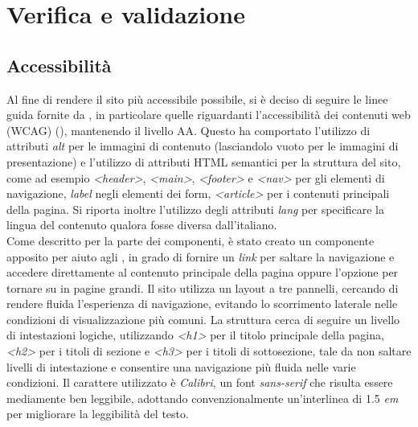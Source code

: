 \chapter{Verifica e validazione}\label{cap:verifica-validazione}


\section{Accessibilità}\label{sec:verifica-validazione-accessibilita}

Al fine di rendere il sito più accessibile possibile, si è deciso di seguire le linee guida fornite da , in particolare quelle riguardanti l'accessibilità dei contenuti web (WCAG) (\cite{site:wcag}), mantenendo il livello AA.\@
Questo ha comportato l'utilizzo di attributi \textit{alt} per le immagini di contenuto (lasciandolo vuoto per le immagini di presentazione) e l'utilizzo di attributi HTML semantici per la struttura del sito, come 
ad esempio \textit{<header>}, \textit{<main>}, \textit{<footer>} e \textit{<nav>} per gli elementi di navigazione, \textit{label} negli elementi dei form, \textit{<article>} per i contenuti principali della pagina.
Si riporta inoltre l'utilizzo degli attributi \textit{lang} per specificare la lingua del contenuto qualora fosse diversa dall'italiano. \\

Come descritto per la parte dei componenti, è stato creato un componente apposito per aiuto agli , in grado di fornire un \textit{link} per saltare la navigazione e accedere direttamente al contenuto principale della pagina
oppure l'opzione per tornare su in pagine grandi.
Il sito utilizza un layout a tre pannelli, cercando di rendere fluida l'esperienza di navigazione, evitando lo scorrimento laterale nelle condizioni di visualizzazione più comuni.
La struttura cerca di seguire un livello di intestazioni logiche, utilizzando \textit{<h1>} per il titolo principale della pagina, \textit{<h2>} per i titoli di sezione e \textit{<h3>} per i titoli di sottosezione,
tale da non saltare livelli di intestazione e consentire una navigazione più fluida nelle varie condizioni.
Il carattere utilizzato è \textit{Calibri}, un font \textit{sans-serif} che risulta essere mediamente ben leggibile, adottando convenzionalmente un'interlinea di 1.5 \textit{em} per migliorare la leggibilità del testo. \\

